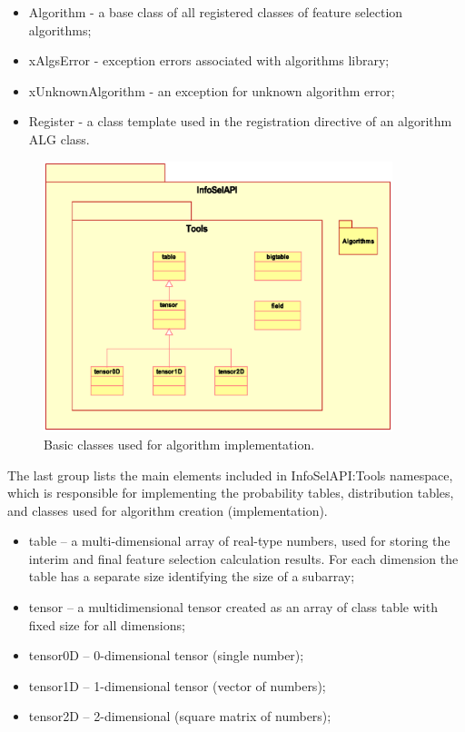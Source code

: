 \documentclass[a4paper,fleqn]{report}
\begin{document}
\begin{itemize}
\item Algorithm - a base class of all registered classes of feature selection algorithms;
\item xAlgsError - exception errors associated with algorithms library;
\item xUnknownAlgorithm - an exception for unknown algorithm error;
\item Register - a class template used in the registration directive of an algorithm ALG class.
\end{itemize}

\begin{figure}[!hb] \label{pic:lib-tools}
   \begin{center}
     \includegraphics[width=4in]{./figs/Lib-tools.eps}
   \end{center}
   \caption{\small Basic classes used for algorithm implementation.}
\end{figure}

The last group lists the main elements included in InfoSelAPI:Tools namespace, which is
responsible for implementing the probability tables, distribution tables, and classes used for algorithm creation (implementation).

\begin{itemize}
\item table -- a multi-dimensional array of real-type numbers, used for storing the interim and final feature selection calculation results. For each dimension the table has a separate size identifying the size of a subarray;
\item tensor -- a multidimensional tensor created as an array of class table with fixed size for all dimensions;
\item tensor0D -- 0-dimensional tensor (single number);
\item tensor1D -- 1-dimensional tensor (vector of numbers);
\item tensor2D -- 2-dimensional (square matrix of numbers);
\end{itemize}
\end{document}
